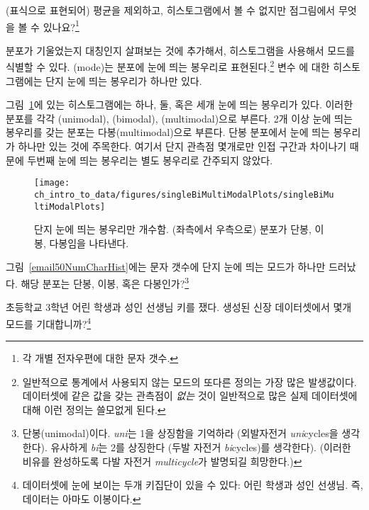 \begin{exercise}
(표식으로 표현되어) 평균을 제외하고, 히스토그램에서 볼 수 없지만 점그림에서 무엇을 볼 수 있나요?\footnote{
각 개별 전자우편에 대한 문자 갯수.}
\end{exercise}

분포가 기울었는지 대칭인지 살펴보는 것에 추가해서, 히스토그램을 사용해서 모드를 식별할 수 있다.
(mode)는 분포에 눈에 띄는 봉우리로 표현된다.\footnote{
일반적으로 통계에서 사용되지 않는 모드의 또다른 정의는 가장 많은 발생값이다. 
데이터셋에 같은 값을 갖는 관측점이 \emph{없는} 것이 일반적으로 많은 실제 데이터셋에 대해 이런 정의는 쓸모없게 된다.}
변수 에 대한 히스토그램에는 단지 눈에 띄는 봉우리가 하나만 있다.

그림~\ref{singleBiMultiModalPlots}에 있는 히스토그램에는 하나, 둘, 혹은 세개 눈에 띄는 봉우리가 있다.
이러한 분포를 각각 (unimodal), (bimodal), (multimodal)으로 부른다. 2개 이상 눈에 띄는 봉우리를 갖는 분포는 다봉(multimodal)으로 부른다.
단봉 분포에서 눈에 띄는 봉우리가 하나만 있는 것에 주목한다. 여기서 단지 관측점 몇개로만 인접 구간과 차이나기 때문에 
두번째 눈에 띄는 봉우리는 별도 봉우리로 간주되지 않았다.


\begin{figure}[h]
   \centering
   \texttt{[image: ch\_intro\_to\_data/figures/singleBiMultiModalPlots/singleBiMultiModalPlots]}
   \caption{단지 눈에 띄는 봉우리만 개수함. (좌측에서 우측으로) 분포가 단봉, 이봉, 다봉임을 나타낸다.}
   \label{singleBiMultiModalPlots}
\end{figure}

\begin{exercise}
그림~\ref{email50NumCharHist}에는 문자 갯수에 단지 눈에 띄는 모드가 하나만 드러났다.
해당 분포는 단봉, 이봉, 혹은 다봉인가?\footnote{
단봉(unimodal)이다. \emph{uni}는 1을 상징함을 기억하라 (외발자전거 \emph{uni}cycles을 생각한다).
유사하게 \emph{bi}는 2를 상징한다 (두발 자전거 \emph{bi}cycles)를 생각한다). (이러한 비유를 완성하도록 
다발 자전거 \emph{multicycle}가 발명되길 희망한다.)}
\end{exercise}

\begin{exercise}
초등학교 3학년 어린 학생과 성인 선생님 키를 쟀다. 생성된 신장 데이터셋에서 몇개 모드를 기대합니까?\footnote{
데이터셋에 눈에 보이는 두개 키집단이 있을 수 있다: 어린 학생과 성인 선생님. 즉, 데이터는 아마도 이봉이다.}
\end{exercise}

